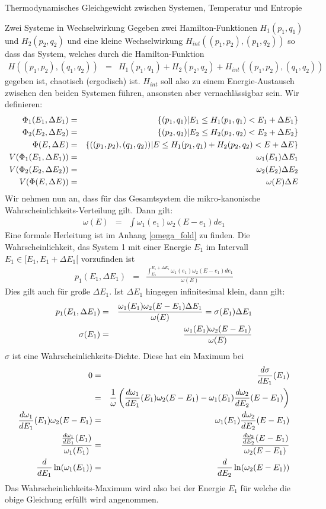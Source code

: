 \begin{chapter}{\titlestr}
\begin{section}{Thermodynamisches Gleichgewicht zwischen Systemen, Temperatur und Entropie}
\begin{subsection}{Zwei Systeme in Wechselwirkung}
Gegeben zwei Hamilton-Funktionen $H_1(p_1,q_1)$ und $H_2(p_2,q_2)$ und eine kleine Wechselwirkung $H_{int}((p_1,p_2),(p_1,q_2))$
so dass das System, welches durch die Hamilton-Funktion
\begin{eqnarray*}
H((p_1,p_2),(q_1,q_2)) &=& H_1(p_1,q_1)+H_2(p_2,q_2)+H_{int}((p_1,p_2),(q_1,q_2))
\end{eqnarray*}
gegeben ist, chaotisch (ergodisch) ist. $H_{int}$ soll also zu einem Energie-Austausch zwischen den beiden Systemen führen, ansonsten aber vernachlässigbar sein.
Wir definieren:
\begin{eqnarray}
\label{microcanonic_phase_space_volume}
\Phi_1(E_1,\Delta E_1) &=& \{(p_1,q_1) | E_1 \le H_1(p_1,q_1) < E_1+\Delta E_1 \}\cr
\Phi_2(E_2,\Delta E_2) &=& \{(p_2,q_2) | E_2 \le H_2(p_2,q_2) < E_2+\Delta E_2 \}\cr
\Phi(E,\Delta E) &=& \{((p_1,p_2),(q_1,q_2)) | E \le H_1(p_1,q_1)+H_2(p_2,q_2) < E+\Delta E \}\cr
V(\Phi_1(E_1,\Delta E_1)) &=& \omega_1(E_1)\Delta E_1\cr
V(\Phi_2(E_2,\Delta E_2)) &=& \omega_2(E_2)\Delta E_2\cr
V(\Phi(E,\Delta E)) &=& \omega(E)\Delta E
\end{eqnarray}
Wir nehmen nun an, dass für das Gesamtsystem die mikro-kanonische Wahrscheinlichkeits-Verteilung gilt. 
Dann gilt:
\begin{eqnarray}
\label{entropy_coupled}
\omega(E) &=& \int \omega_1(e_1)\omega_2(E-e_1) de_1
\end{eqnarray}
Eine formale Herleitung ist im Anhang \ref{omega_fold}
zu finden. Die Wahrscheinlichkeit, das System 1 mit einer Energie $E_1$ im Intervall
$E_1\in [E_1,E_1+\Delta E_1[$ vorzufinden ist
\begin{eqnarray*}
p_1(E_1,\Delta E_1) &=& \frac{\int_{E_1}^{E_1+\Delta E_1} \omega_1(e_1)\omega_2(E-e_1) de_1}{\omega(E)}
\end{eqnarray*}
Dies gilt auch für große $\Delta E_1$. Ist $\Delta E_1$ hingegen infinitesimal klein, dann gilt:
\begin{eqnarray}
\label{2_systems_microcanonic}
p_1(E_1,\Delta E_1) &=& \frac{\omega_1(E_1)\omega_2(E-E_1) \Delta E_1}{\omega(E)}=\sigma(E_1)\Delta E_1\cr
\sigma(E_1) &=& \frac{\omega_1(E_1)\omega_2(E-E_1)}{\omega(E)}
\end{eqnarray}
$\sigma$ ist eine Wahrscheinlichkeits-Dichte. Diese hat ein Maximum bei
\begin{eqnarray}
\label{equilib_cond}
0 &=& \frac{d\sigma}{dE_1}(E_1)\cr
&=& \frac{1}{\omega}\left(\frac{d\omega_1}{d E_1}(E_1)\omega_2(E-E_1)-\omega_1(E_1)\frac{d\omega_2}{d E_2}(E-E_1)\right)\cr
\frac{d\omega_1}{d E_1}(E_1)\omega_2(E-E_1)&=&\omega_1(E_1)\frac{d\omega_2}{d E_2}(E-E_1)\cr
\frac{\frac{d\omega_1}{d E_1}(E_1)}{\omega_1(E_1)} &=& \frac{\frac{d\omega_2}{d E_2}(E-E_1)}{\omega_2(E-E_1)}\cr
\frac{d}{dE_1}\ln(\omega_1(E_1)) &=& \frac{d}{dE_2}\ln(\omega_2(E-E_1))
\end{eqnarray}
Das Wahrscheinlichkeits-Maximum wird also bei der Energie $E_1$ für welche die obige Gleichung erfüllt wird angenommen.
\end{subsection}



\end{section}
\end{chapter}
